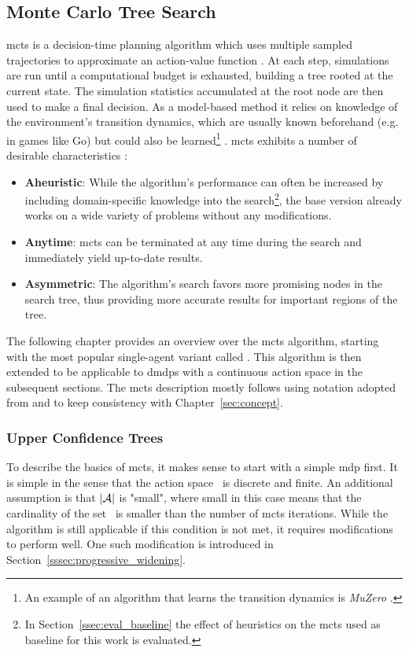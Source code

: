 \subsection{Monte Carlo Tree Search}\label{ssec:mcts}
\gls{mcts} is a decision-time planning algorithm which uses multiple sampled trajectories to approximate an action-value function \cite{suttonReinforcementLearningIntroduction2018}. At each step, simulations are run until a computational budget is exhausted, building a tree rooted at the current state. The simulation statistics accumulated at the root node are then used to make a final decision. As a model-based method it relies on knowledge of the environment's transition dynamics, which are usually known beforehand (e.g. in games like Go) but could also be learned\footnote{An example of an algorithm that learns the transition dynamics is \emph{MuZero} \cite{schrittwieserMasteringAtariGo2020}.} \cite{francois-lavetIntroductionDeepReinforcement2018}. \gls{mcts} exhibits a number of desirable characteristics \cite{browneSurveyMonteCarlo2012}:
\begin{itemize}
    \item \textbf{Aheuristic}: While the algorithm's performance can often be increased by including domain-specific knowledge into the search\footnote{In Section~\ref{ssec:eval_baseline} the effect of heuristics on the \gls{mcts} used as baseline for this work is evaluated.}, the base version already works on a wide variety of problems without any modifications.
    \item \textbf{Anytime}: \gls{mcts} can be terminated at any time during the search and immediately yield up-to-date results.
    \item \textbf{Asymmetric}: The algorithm's search favors more promising nodes in the search tree, thus providing more accurate results for important regions of the tree.
\end{itemize}
The following chapter provides an overview over the \gls{mcts} algorithm, starting with the most popular single-agent variant called . This algorithm is then extended to be applicable to \glspl{dmdp} with a continuous action space in the subsequent sections. The \gls{mcts} description mostly follows \cite{browneSurveyMonteCarlo2012} using notation adopted from \cite{moerlandA0CAlphaZero2018} and \cite{silverMasteringGameGo2016, silverMasteringGameGo2017} to keep consistency with Chapter~\ref{sec:concept}.

\subsubsection{Upper Confidence Trees}\label{sssec:uct}
To describe the basics of \gls{mcts}, it makes sense to start with a simple \gls{mdp} first. It is simple in the sense that the action space \actionspace\ is discrete and finite. An additional assumption is that $|\actionspace|$ is "small", where small in this case means that the cardinality of the set \actionspace\ is smaller than the number of \gls{mcts} iterations. While the algorithm is still applicable if this condition is not met, it requires modifications to perform well. One such modification is introduced in Section~\ref{sssec:progressive_widening}.

